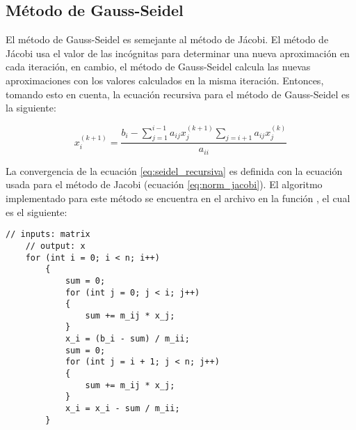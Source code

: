 \subsection{Método de Gauss-Seidel}

El método de Gauss-Seidel es semejante al método de Jácobi. El método de Jácobi usa el valor de las incógnitas para determinar una nueva aproximación en cada iteración, en cambio, el método de Gauss-Seidel calcula las nuevas aproximaciones con los valores calculados en la misma iteración. Entonces, tomando esto en cuenta, la ecuación recursiva para el método de Gauss-Seidel es la siguiente:

\begin{equation}
    x_i^{(k+1)} = \frac{b_i - \sum\limits_{j=1}^{i-1} a_{ij}x_{j}^{(k+1)}\sum\limits_{j= i+1} a_{ij}x_{j}^{(k)}}{a_{ii}} \label{eq:seidel_recursiva}
\end{equation}

La convergencia de la ecuación \ref{eq:seidel_recursiva} es definida con la ecuación usada para el método de Jacobi (ecuación \ref{eq:norm_jacobi}). El algoritmo implementado para este método se encuentra en el archivo  en la función , el cual es el siguiente:

\begin{lstlisting}[style=CStyle]
    // inputs: matrix
    // output: x
    for (int i = 0; i < n; i++)
        {
            sum = 0;
            for (int j = 0; j < i; j++)
            {
                sum += m_ij * x_j;
            }
            x_i = (b_i - sum) / m_ii;
            sum = 0;
            for (int j = i + 1; j < n; j++)
            {
                sum += m_ij * x_j;
            }
            x_i = x_i - sum / m_ii;
        }
\end{lstlisting}
